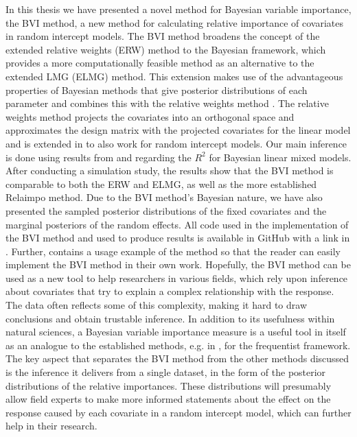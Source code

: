 In this thesis we have presented a novel method for Bayesian variable importance, the BVI method, a new method for calculating relative importance of covariates in random intercept models.
The BVI method broadens the concept of the extended relative weights (ERW) method to the Bayesian framework, which provides a more computationally feasible method as an alternative to the extended LMG (ELMG) method.
This extension makes use of the advantageous properties of Bayesian methods that give posterior distributions of each parameter and combines this with the relative weights method \citep{johnson_relative_weights}.
The relative weights method projects the covariates into an orthogonal space and approximates the design matrix with the projected covariates \citep{johnson_relative_weights,mirsky-theorem} for the linear model and is extended in \citet{matre} to also work for random intercept models.
Our main inference is done using results from \citep{gelman2017rsquared} and \citet{nakagawa2013general} regarding the $R^2$ for Bayesian linear mixed models.
After conducting a simulation study, the results show that the BVI method is comparable to both the ERW and ELMG, as well as the more established Relaimpo method. 
Due to the BVI method's Bayesian nature, we have also presented the sampled posterior distributions of the fixed covariates and the marginal posteriors of the random effects.
All code used in the implementation of the BVI method and used to produce results is available in GitHub with a link in . 
Further,  contains a usage example of the method so that the reader can easily implement the BVI method in their own work.
\newline
\newline
Hopefully, the BVI method can be used as a new tool to help researchers in various fields, which rely upon inference about covariates that try to explain a complex relationship with the response.
The data often reflects some of this complexity, making it hard to draw conclusions and obtain trustable inference.
In addition to its usefulness within natural sciences, a Bayesian variable importance measure is a useful tool in itself as an analogue to the established methods, e.g. in \citet{gromping_relaimpo}, for the frequentist framework.
The key aspect that separates the BVI method from the other methods discussed is the inference it delivers from a single dataset, in the form of the posterior distributions of the relative importances.
These distributions will presumably allow field experts to make more informed statements about the effect on the response caused by each covariate in a random intercept model, which can further help in their research.
